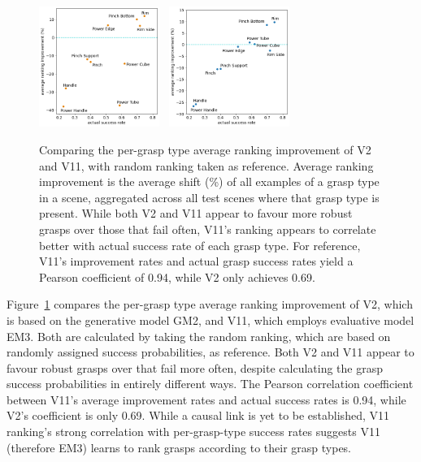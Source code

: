 \begin{figure}[h]
\begin{center}
\includegraphics[width=0.35\textwidth]{images/post-analysis/V2_suc_rate_vs_improvement.png}~
\includegraphics[width=0.35\textwidth]{images/post-analysis/V11_suc_rate_vs_improvement.png}
\caption{Comparing the per-grasp type average ranking improvement of V2 and V11, with random ranking taken as reference. Average ranking improvement is the average shift (\%) of all examples of a grasp type in a scene, aggregated across all test scenes where that grasp type is present. While both V2 and V11 appear to favour more robust grasps over those that fail often, V11's ranking appears to correlate better with actual success rate of each grasp type. For reference, V11's improvement rates and actual grasp success rates yield a Pearson coefficient of 0.94, while V2 only achieves 0.69. \label{fig:v2_vs_v11_rates}}
\end{center}
\end{figure}


Figure~\ref{fig:v2_vs_v11_rates} compares the per-grasp type average ranking improvement of V2, which is based on the generative model GM2, and V11, which employs evaluative model EM3. Both are calculated by taking the random ranking, which are based on randomly assigned success probabilities, as reference. Both V2 and V11 appear to favour robust grasps over that fail more often, despite calculating the grasp success probabilities in entirely different ways. The Pearson correlation coefficient between V11's average improvement rates and actual success rates is 0.94, while V2's coefficient is only 0.69. While a causal link is yet to be established, V11 ranking's strong correlation with per-grasp-type success rates suggests V11 (therefore EM3) learns to rank grasps according to their grasp types.

